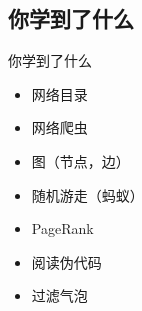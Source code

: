 \subsection{你学到了什么}
\begin{frame}{你学到了什么}
    \begin{itemize}
        \item 网络目录
        \item 网络爬虫
        \item 图（节点，边）
        \item 随机游走（蚂蚁）
        \item PageRank
        \item 阅读伪代码
        \item 过滤气泡
    \end{itemize}
\end{frame}